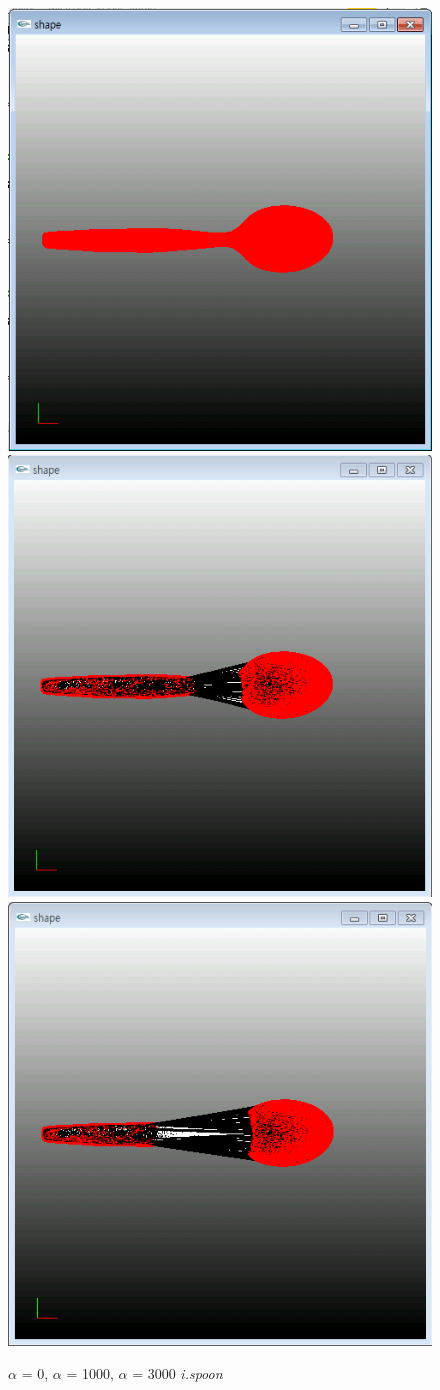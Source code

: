 \documentclass[11pt]{article}
\begin{document}
\begin{figure}[ht]
\includegraphics[width=.5\textwidth]{FIGS/alpha0-ispoon}
\hspace{1cm}
\includegraphics[width=.5\textwidth]{FIGS/alpha1000-ispoon}
\vspace{1cm}
\includegraphics[width=.5\textwidth]{FIGS/alpha3000-ispoon}
\caption{$\alpha$ = 0, $\alpha$ = 1000, $\alpha$ = 3000 \textit{i.spoon}}
\end{figure}
\end{document}
